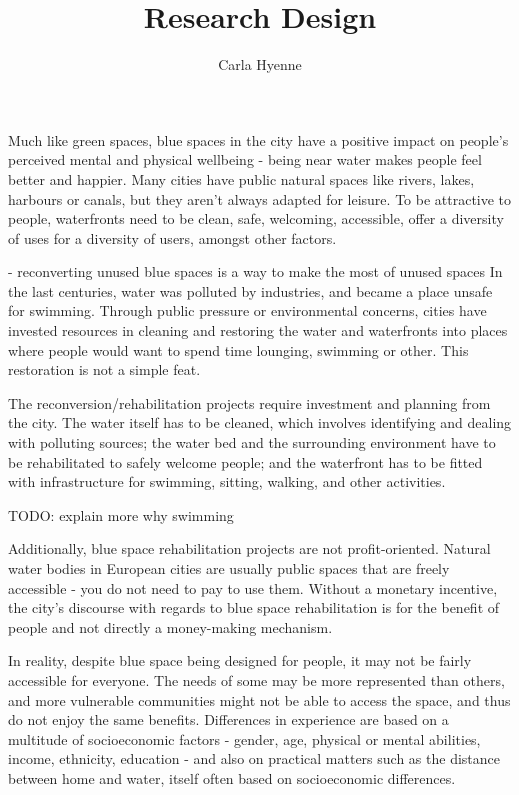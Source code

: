 \documentclass{article}
\title{Research Design}
\author{Carla Hyenne}
\date{}
\begin{document}
\maketitle


Much like green spaces, blue spaces in the city have a positive impact on people's perceived mental and physical wellbeing - being near water makes people feel better and happier. Many cities have public natural spaces like rivers, lakes, harbours or canals, but they aren't always adapted for leisure. To be attractive to people, waterfronts need to be clean, safe, welcoming, accessible, offer a diversity of uses for a diversity of users, amongst other factors. 

- reconverting unused blue spaces is a way to make the most of unused spaces 
In the last centuries, water was polluted by industries, and became a place unsafe for swimming. Through public pressure or environmental concerns, cities have invested resources in cleaning and restoring the water and waterfronts into places where people would want to spend time lounging, swimming or other. This restoration is not a simple feat. 

The reconversion/rehabilitation projects require investment and planning from the city. The water itself has to be cleaned, which involves identifying and dealing with polluting sources; the water bed and the surrounding environment have to be rehabilitated to safely welcome people; and the waterfront has to be fitted with infrastructure for swimming, sitting, walking, and other activities.

TODO: explain more why swimming

Additionally, blue space rehabilitation projects are not profit-oriented. Natural water bodies in European cities are usually public spaces that are freely accessible - you do not need to pay to use them. Without a monetary incentive, the city's discourse with regards to blue space rehabilitation is for the benefit of people and not directly a money-making mechanism.

In reality, despite blue space being designed for people, it may not be fairly accessible for everyone. The needs of some may be more represented than others, and more vulnerable communities might not be able to access the space, and thus do not enjoy the same benefits. Differences in experience are based on a multitude of socioeconomic factors - gender, age, physical or mental abilities, income, ethnicity, education - and also on practical matters such as the distance between home and water, itself often based on socioeconomic differences.
\end{document}
